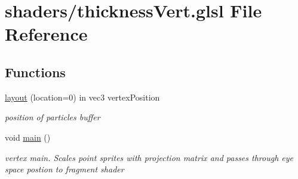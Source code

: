 \hypertarget{thickness_vert_8glsl}{\section{shaders/thickness\-Vert.glsl File Reference}
\label{thickness_vert_8glsl}
}
\subsection*{Functions}
\begin{DoxyCompactItemize}
\item 
\hypertarget{thickness_vert_8glsl_a3a9bed495f596aa8aed4121aacc43fdd}{\hyperlink{thickness_vert_8glsl_a3a9bed495f596aa8aed4121aacc43fdd}{layout} (location=0) in vec3 vertex\-Position}\label{thickness_vert_8glsl_a3a9bed495f596aa8aed4121aacc43fdd}

\begin{DoxyCompactList}\small\item\em position of particles buffer \end{DoxyCompactList}\item 
\hypertarget{thickness_vert_8glsl_acdef7a1fd863a6d3770c1268cb06add3}{void \hyperlink{thickness_vert_8glsl_acdef7a1fd863a6d3770c1268cb06add3}{main} ()}\label{thickness_vert_8glsl_acdef7a1fd863a6d3770c1268cb06add3}

\begin{DoxyCompactList}\small\item\em vertex main. Scales point sprites with projection matrix and passes through eye space postion to fragment shader \end{DoxyCompactList}\end{DoxyCompactItemize}
